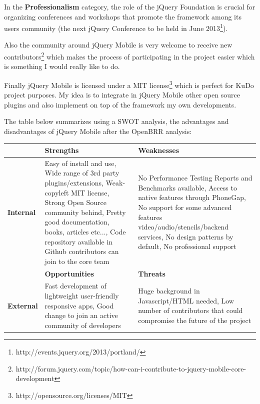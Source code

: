 \documentclass[a4paper,12pt]{book}
\begin{document}
In the \textbf{Professionalism} category, the role of the jQuery Foundation is crucial for organizing conferences and workshops that promote the framework among its users community (the next jQuery Conference to be held in June 2013\footnote{http://events.jquery.org/2013/portland/}).

Also the community around jQuery Mobile is very welcome to receive new contributors\footnote{http://forum.jquery.com/topic/how-can-i-contribute-to-jquery-mobile-core-development} which makes the process of participating in the project easier which is something I would really like to do.

Finally jQuery Mobile is licensed under a MIT license\footnote{http://opensource.org/licenses/MIT} which is perfect for KuDo project purposes. My idea is to integrate in jQuery Mobile other open source plugins and also implement on top of the framework my own developments.

The table below summarizes using a SWOT analysis, the advantages and disadvantages of jQuery Mobile after the OpenBRR analysis:

\begin{center}
    \begin{tabular}{ | p{1.7cm} | p{6cm} | p{6cm} |}
    \hline
    & \textbf{Strengths} & \textbf{Weaknesses} \\ \hline
    \textbf{Internal} & 
    Easy of install and use, %
    Wide range of 3rd party plugins/extensions,
    Weak-copyleft MIT license,
    Strong Open Source community behind,
    Pretty good documentation, books, articles etc...,
    Code repository available in Github contributors can join to the core team
    & No Performance Testing Reports and Benchmarks available, %
    Access to native features through PhoneGap, 
    No support for some advanced features video/audio/stencils/backend services,
    No design patterns by default,
    No professional support\\ \hline
    & \textbf{Opportunities} & \textbf{Threats} \\ \hline
    \textbf{External}  
    & Fast development of lightweight user-friendly responsive apps, %
    Good change to join an active community of developers
    & Huge background in Javascript/HTML needed, %
    Low number of contributors that could compromise the future of the project\\ \hline
    \end{tabular}
\end{center}
\end{document}
